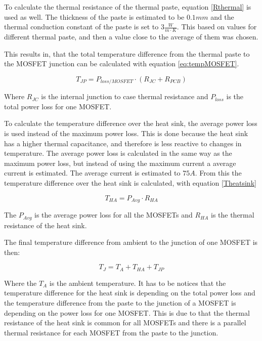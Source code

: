 To calculate the thermal resistance of the thermal paste, equation \ref{Rthermal} is used as well. The thickness of the paste is estimated to be $0.1 mm$ and the thermal conduction constant of the paste is set to $3 \frac{W}{m \cdot K}$. This based on values for different thermal paste, and then a value close to the average of them was chosen.

This results in, that the total temperature difference from the thermal paste to the MOSFET junction can be calculated with equation \ref{eq:tempMOSFET}.

    \begin{equation}
        T_{JP} = P_{loss/MOSFET} \cdot (R_{JC} + R_{PCB})
        \label{eq:tempMOSFET}
    \end{equation}
    
Where $R_{JC}$ is the internal junction to case thermal resistance and $P_{loss}$ is the total power loss for one MOSFET. 

To calculate the temperature difference over the heat sink, the average power loss is used instead of the maximum power loss. This is done because the heat sink has a higher thermal capacitance, and therefore is less reactive to changes in temperature. The average power loss is calculated in the same way as the maximum power loss, but instead of using the maximum current a average current is estimated. The average current is estimated to $75 A$.
From this the temperature difference over the heat sink is calculated, with equation \ref{Theatsink} 

    \begin{equation}
        T_{HA} = P_{Avg} \cdot R_{HA}
        \label{Theatsink}
    \end{equation}

The $P_{Avg}$ is the average power loss for all the MOSFETs and $R_{HA}$ is the thermal resistance of the heat sink. 

The final temperature difference from ambient to the junction of one MOSFET is then:

    \begin{equation}
        T_{J} = T_A + T_{HA} + T_{JP}
        \label{Theatsink}
    \end{equation}
    
Where the $T_A$ is the ambient temperature. It has to be notices that the temperature difference for the heat sink is depending on the total power loss and the temperature difference from the paste to the junction of a MOSFET is depending on the power loss for one MOSFET. This is due to that the thermal resistance of the heat sink is common for all MOSFETs and there is a parallel thermal resistance for each MOSFET from the paste to the junction.


